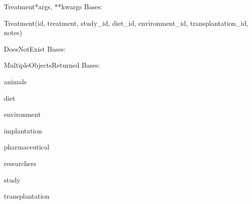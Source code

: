 \documentclass[letterpaper,10pt,english]{sphinxmanual}
\begin{document}
\hypertarget{data.models.Treatment}{}\begin{classdesc}{Treatment}{*args, **kwargs}
Bases: 

Treatment(id, treatment, study\_id, diet\_id, environment\_id, transplantation\_id, notes)

\hypertarget{data.models.Treatment.DoesNotExist}{}\begin{excdesc}{DoesNotExist}
Bases: 
\end{excdesc}

\hypertarget{data.models.Treatment.MultipleObjectsReturned}{}\begin{excdesc}{MultipleObjectsReturned}
Bases: 
\end{excdesc}

\hypertarget{data.models.Treatment.animals}{}\begin{memberdesc}[Treatment]{animals}\end{memberdesc}

\hypertarget{data.models.Treatment.diet}{}\begin{memberdesc}[Treatment]{diet}\end{memberdesc}

\hypertarget{data.models.Treatment.environment}{}\begin{memberdesc}[Treatment]{environment}\end{memberdesc}

\hypertarget{data.models.Treatment.implantation}{}\begin{memberdesc}[Treatment]{implantation}\end{memberdesc}

\hypertarget{data.models.Treatment.pharmaceutical}{}\begin{memberdesc}[Treatment]{pharmaceutical}\end{memberdesc}

\hypertarget{data.models.Treatment.researchers}{}\begin{memberdesc}[Treatment]{researchers}\end{memberdesc}

\hypertarget{data.models.Treatment.study}{}\begin{memberdesc}[Treatment]{study}\end{memberdesc}

\hypertarget{data.models.Treatment.transplantation}{}\begin{memberdesc}[Treatment]{transplantation}\end{memberdesc}
\end{classdesc}
\end{document}
